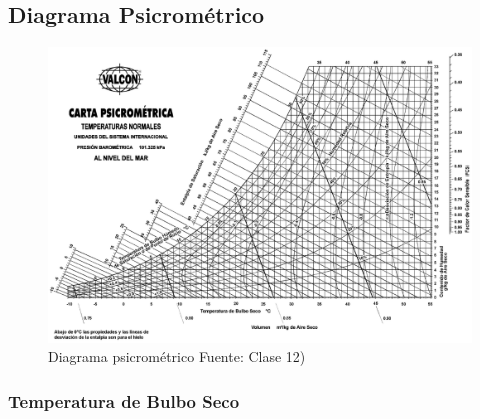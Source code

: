     \subsection{Diagrama Psicrométrico}
    
    \begin{quote}
    \end{quote}
    
    \begin{figure}
        \includegraphics[width=.8\textwidth]{img/clases/diagrama_psicrometrico.png}
        \caption{Diagrama psicrométrico  Fuente: Clase 12)}
        \label{fig:diagrama_psicrometrico}
    \end{figure}
    
        \subsubsection{Temperatura de Bulbo Seco}
        
